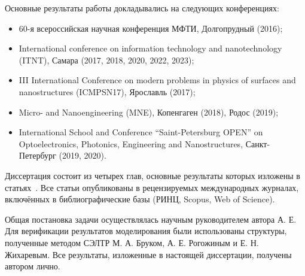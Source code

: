 Основные результаты работы докладывались на следующих конференциях:
\begin{itemize}
	\item 60-я всероссийская научная конференция МФТИ, Долгопрудный (2016);
	\item International conference on information technology and nanotechnology (ITNT), Самара (2017, 2018, 2020, 2022, 2023);
	\item III International Conference on modern problems in physics of surfaces and nanostructures (ICMPSN17), Ярославль (2017);
	\item Micro- and Nanoengineering (MNE), Копенгаген (2018), Родос (2019);
	\item International School and Conference ``Saint-Petersburg OPEN'' on Optoelectronics, Photonics, Engineering and Nanostructures, Санкт-Петербург (2019, 2020).	
\end{itemize}

Диссертация состоит из четырех глав, основные результаты которых изложены в статьях~\cite{my_CO, my_microlenses, my_evidence, my_detailed, my_review_RU, my_MEE, my_Gvalue, my_microscopic, my_Isaev_RU}. Все статьи опубликованы в рецензируемых международных журналах, включённых в библиографические базы (РИНЦ, Scopus, Web of Science).


\contribution
Общая постановка задачи осуществлялась научным руководителем автора  А. Е. Для верификации результатов моделирования были использованы структуры, полученные методом СЭЛТР М. А. Бруком, А. Е. Рогожиным и Е. Н. Жихаревым. Все результаты, изложенные в настоящей диссертации, получены автором лично.
